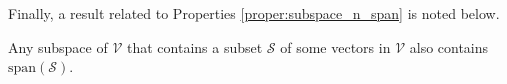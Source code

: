 Finally, a result related to Properties \ref{proper:subspace_n_span} is noted below.
\begin{proper}
\label{proper:WcontainsspanS}
Any subspace of $\mathcal{V}$ that contains a subset $\mathcal{S}$ of some vectors in $\mathcal{V}$ also contains $\text{span}(\mathcal{S})$.
\end{proper}


